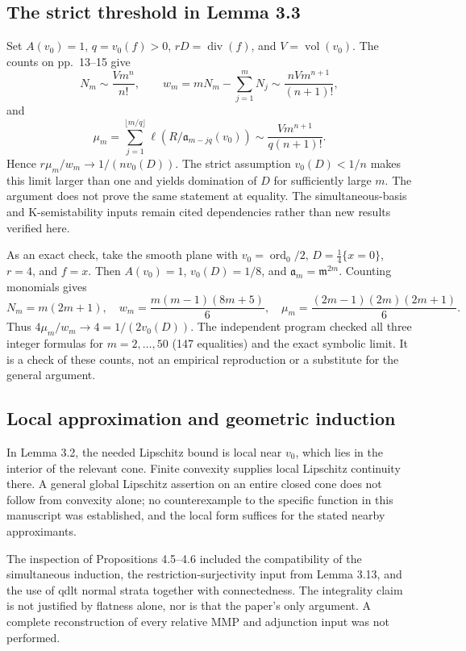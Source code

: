 \documentclass[10pt]{article}
\begin{document}
\subsection*{The strict threshold in Lemma 3.3}
Set \(A(v_0)=1\), \(q=v_0(f)>0\), \(rD=\operatorname{div}(f)\), and \(V=\operatorname{vol}(v_0)\). The counts on pp. 13–15 give \[N_m\sim\frac{Vm^n}{n!},\qquad
 w_m=mN_m-\sum_{j=1}^mN_j
       \sim\frac{nVm^{n+1}}{(n+1)!},\] and \[\mu_m=\sum_{j=1}^{\lfloor m/q\rfloor}
            \ell(R/\mathfrak a_{m-jq}(v_0))
       \sim\frac{Vm^{n+1}}{q(n+1)!}.\] Hence \(r\mu_m/w_m\longrightarrow1/(n v_0(D))\). The strict assumption \(v_0(D)<1/n\) makes this limit larger than one and yields domination of \(D\) for sufficiently large \(m\). The argument does not prove the same statement at equality. The simultaneous-basis and K-semistability inputs remain cited dependencies rather than new results verified here.\par
As an exact check, take the smooth plane with \(v_0=\operatorname{ord}_0/2\), \(D=\frac14\{x=0\}\), \(r=4\), and \(f=x\). Then \(A(v_0)=1\), \(v_0(D)=1/8\), and \(\mathfrak a_m=\mathfrak m^{2m}\). Counting monomials gives \[N_m=m(2m+1),\quad
 w_m=\frac{m(m-1)(8m+5)}6,\quad
 \mu_m=\frac{(2m-1)(2m)(2m+1)}6.\] Thus \(4\mu_m/w_m\to4=1/(2v_0(D))\). The independent program checked all three integer formulas for \(m=2,\ldots,50\) (147 equalities) and the exact symbolic limit. It is a check of these counts, not an empirical reproduction or a substitute for the general argument.\par
\subsection*{Local approximation and geometric induction}
In Lemma 3.2, the needed Lipschitz bound is local near \(v_0\), which lies in the interior of the relevant cone. Finite convexity supplies local Lipschitz continuity there. A general global Lipschitz assertion on an entire closed cone does not follow from convexity alone; no counterexample to the specific function in this manuscript was established, and the local form suffices for the stated nearby approximants.\par
The inspection of Propositions 4.5–4.6 included the compatibility of the simultaneous induction, the restriction-surjectivity input from Lemma 3.13, and the use of qdlt normal strata together with connectedness. The integrality claim is not justified by flatness alone, nor is that the paper’s only argument. A complete reconstruction of every relative MMP and adjunction input was not performed.\par
\end{document}
